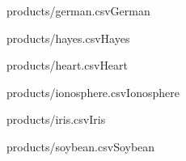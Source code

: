 \documentclass[]{article}
\begin{document}
\begin{table}[!ht]
    \parbox{.45\linewidth}{
	    \begin{ride}{products/german.csv}{German}\end{ride}
	}
	\hfill
    \parbox{.45\linewidth}{
	    \begin{ride}{products/hayes.csv}{Hayes}\end{ride}
	}
\end{table}

\begin{table}[!ht]
    \parbox{.45\linewidth}{
	    \begin{ride}{products/heart.csv}{Heart}\end{ride}
	}
	\hfill
    \parbox{.45\linewidth}{
	    \begin{ride}{products/ionosphere.csv}{Ionosphere}\end{ride}
	}
\end{table}

\begin{table}[!ht]
    \parbox{.45\linewidth}{
	    \begin{ride}{products/iris.csv}{Iris}\end{ride}
	}
	\hfill
    \parbox{.45\linewidth}{
	    \begin{ride}{products/soybean.csv}{Soybean}\end{ride}
	}
\end{table}
\end{document}
